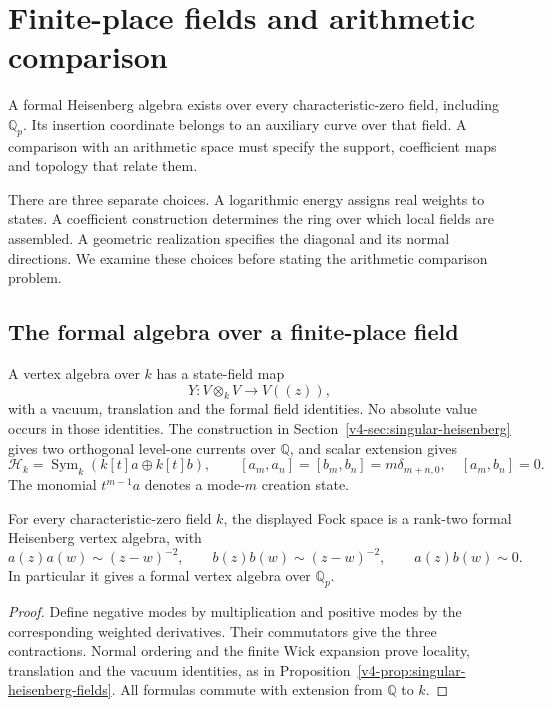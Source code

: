 \chapter{Finite-place fields and arithmetic comparison}
\label{v4-arith:drinfeld-kapranov}

A formal Heisenberg algebra exists over every characteristic-zero
field, including \(\mathbb Q_p\). Its insertion coordinate belongs
to an auxiliary curve over that field. A comparison with an
arithmetic space must specify the support, coefficient maps and
topology that relate them.

There are three separate choices. A logarithmic energy assigns
real weights to states. A coefficient construction determines the
ring over which local fields are assembled. A geometric realization
specifies the diagonal and its normal directions. We examine these
choices before stating the arithmetic comparison problem.

\section{The formal algebra over a finite-place field}
\label{v4-arith:dk:algebraic-step}

A vertex algebra over \(k\) has a state-field map
\[
                         Y:V\otimes_kV\longrightarrow V((z)),
\]
with a vacuum, translation and the formal field identities.
No absolute value occurs in those identities. The construction
in Section~\ref{v4-sec:singular-heisenberg} gives two orthogonal
level-one currents over \(\mathbb Q\), and scalar extension gives
\[
 \mathcal H_k=\operatorname{Sym}_k(k[t]a\oplus k[t]b),
 \qquad [a_m,a_n]=[b_m,b_n]=m\delta_{m+n,0},\quad[a_m,b_n]=0.
\]
The monomial \(t^{m-1}a\) denotes a mode-\(m\) creation state.

\begin{proposition}\label{v4-arith:prop:formal-padic-va}
For every characteristic-zero field \(k\), the displayed Fock
space is a rank-two formal Heisenberg vertex algebra, with
\[
 a(z)a(w)\sim(z-w)^{-2},\qquad
 b(z)b(w)\sim(z-w)^{-2},\qquad a(z)b(w)\sim0.
\]
In particular it gives a formal vertex algebra over \(\mathbb Q_p\).
\end{proposition}

\begin{proof}
Define negative modes by multiplication and positive modes by the
corresponding weighted derivatives. Their commutators give the
three contractions. Normal ordering and the finite Wick expansion
prove locality, translation and the vacuum identities, as in
Proposition~\ref{v4-prop:singular-heisenberg-fields}.
All formulas commute with extension from \(\mathbb Q\) to \(k\).
\end{proof}

